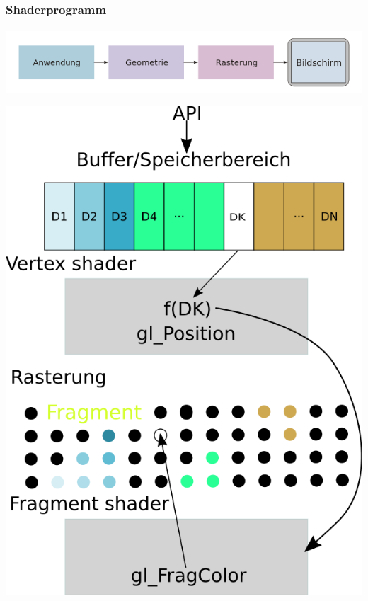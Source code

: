 \documentclass{beamer}
\begin{document}
\begin{frame}
    \frametitle{ Shaderprogramm}
\framesubtitle{}
    \begin{block}{}
\begin{center}
\includegraphics[scale=0.26]{images/cgpipeline_grob}
\end{center}
\end{block}
    \begin{block}{}
\begin{center}
\includegraphics[scale=0.20]{images/Zeichnung_Shaderpipeline}
\end{center}
\end{block}
\end{frame}
\end{document}
